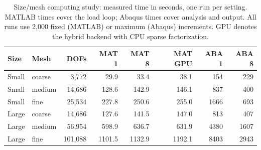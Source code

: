 \begin{table}[htbp]
\centering\small
\caption{Size/mesh computing study: measured time in seconds, one run per setting. MATLAB times cover the load loop; Abaqus times cover analysis and output. All runs use 2{,}000 fixed (MATLAB) or maximum (Abaqus) increments. GPU denotes the hybrid backend with CPU sparse factorization.}
\label{tab:scaling}
\begin{tabular}{llrrrrrr}
\hline
Size & Mesh & DOFs & MAT 1 & MAT 8 & MAT GPU & ABA 1 & ABA 8 \\
\hline
Small & coarse & 3,772 & 29.9 & 33.4 & 38.1 & 154 & 229 \\
Small & medium & 14,686 & 128.6 & 142.9 & 146.1 & 837 & 400 \\
Small & fine & 25,534 & 227.8 & 250.6 & 255.0 & 1666 & 693 \\
Large & coarse & 14,686 & 127.6 & 141.5 & 147.0 & 813 & 407 \\
Large & medium & 56,954 & 598.9 & 636.7 & 631.9 & 4380 & 1607 \\
Large & fine & 101,088 & 1101.5 & 1132.9 & 1192.1 & 8403 & 2943 \\
\hline
\end{tabular}
\end{table}
